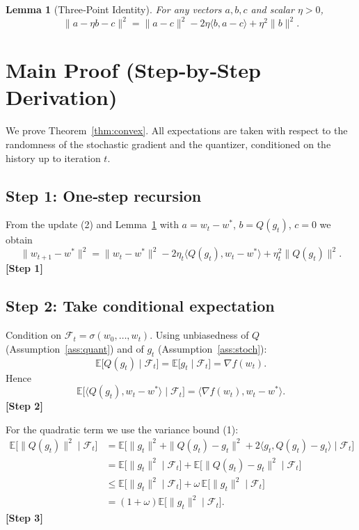 \documentclass{article}
\newtheorem{lemma}{Lemma}
\newcommand{\E}{\mathbb{E}}
\begin{document}
\begin{lemma}[Three‑Point Identity]\label{lem:three}
For any vectors $a,b,c$ and scalar $\eta>0$,
\[
\|a-\eta b-c\|^{2}= \|a-c\|^{2}-2\eta\langle b,a-c\rangle+\eta^{2}\|b\|^{2}.
\]
\end{lemma}

\section*{Main Proof (Step‑by‑Step Derivation)}
We prove Theorem~\ref{thm:convex}. All expectations are taken with respect to the randomness of the stochastic gradient and the quantizer, conditioned on the history up to iteration $t$.

\subsection*{Step 1: One‑step recursion}
From the update (2) and Lemma~\ref{lem:three} with $a=w_{t}-w^{*}$, $b=Q(g_{t})$, $c=0$ we obtain
\[
\|w_{t+1}-w^{*}\|^{2}
 =\|w_{t}-w^{*}\|^{2}-2\eta_{t}\langle Q(g_{t}),w_{t}-w^{*}\rangle
   +\eta_{t}^{2}\|Q(g_{t})\|^{2}. \tag{4}
\]
\textbf{[Step 1]}

\subsection*{Step 2: Take conditional expectation}
Condition on $\mathcal{F}_{t}=\sigma(w_{0},\dots,w_{t})$.
Using unbiasedness of $Q$ (Assumption~\ref{ass:quant}) and of $g_{t}$ (Assumption~\ref{ass:stoch}):
\[
\E\!\bigl[Q(g_{t})\mid\mathcal{F}_{t}\bigr]=\E\!\bigl[g_{t}\mid\mathcal{F}_{t}\bigr]=\nabla f(w_{t}).
\]
Hence
\[
\E\!\bigl[\langle Q(g_{t}),w_{t}-w^{*}\rangle\mid\mathcal{F}_{t}\bigr]
   =\langle\nabla f(w_{t}),w_{t}-w^{*}\rangle. \tag{5}
\]
\textbf{[Step 2]}

For the quadratic term we use the variance bound (1):
\[
\begin{aligned}
\E\!\bigl[\|Q(g_{t})\|^{2}\mid\mathcal{F}_{t}\bigr]
&=\E\!\bigl[\|g_{t}\|^{2}+\|Q(g_{t})-g_{t}\|^{2}+2\langle g_{t},Q(g_{t})-g_{t}\rangle\mid\mathcal{F}_{t}\bigr]\\
&=\E\!\bigl[\|g_{t}\|^{2}\mid\mathcal{F}_{t}\bigr]+\E\!\bigl[\|Q(g_{t})-g_{t}\|^{2}\mid\mathcal{F}_{t}\bigr] \\
&\le \E\!\bigl[\|g_{t}\|^{2}\mid\mathcal{F}_{t}\bigr]+\omega\,\E\!\bigl[\|g_{t}\|^{2}\mid\mathcal{F}_{t}\bigr] \\
&=(1+\omega)\E\!\bigl[\|g_{t}\|^{2}\mid\mathcal{F}_{t}\bigr]. \tag{6}
\end{aligned}
\]
\textbf{[Step 3]}
\end{document}
